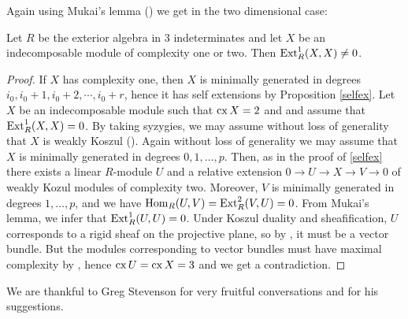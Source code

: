 \documentclass[10pt]{amsart}
\begin{document}
 \noindent  Again using Mukai's lemma (\cite[1.4]{Ru}) we get in the two dimensional case:
 
\begin{prop} Let $R$ be the exterior algebra in $3$ indeterminates
and let $X$ be an indecomposable  module of complexity one or two. Then $\operatorname{Ext}\nolimits^1_R(X,X)\ne 0$.
\end{prop}
\begin{proof}  If $X$ has complexity one, then $X$ is minimally generated in degrees $i_0, i_0+1, i_0+2, \cdots, i_0+r$,
hence it has self extensions by Proposition \ref{selfex}.
Let $X$ be an indecomposable module such that $\operatorname{cx}\nolimits X = 2$ and 
and assume that $\operatorname{Ext}\nolimits^1_R(X,X)=0$. By taking syzygies, we may assume without loss of generality that $X $ is weakly Koszul (\cite{MVZ1}). Again without loss of generality we may assume that $X$ is minimally generated in degrees $0,1,\ldots,p$. Then, as in the proof of \ref{selfex} there exists a linear $R$-module $U$ and a relative extension $0\to U\to X\to V\to 0$ of weakly Kozul modules of complexity  two. Moreover, $V$ is minimally generated in degrees $1,\ldots,p$, and we have $\operatorname{Hom}_R(U,V)=\operatorname{Ext}\nolimits_R^2(V,U)=0$. From Mukai's lemma, we infer that $\operatorname{Ext}\nolimits_R^1(U,U)=0$. Under Koszul duality and sheafification, $U$ corresponds to a rigid sheaf on the projective plane, so by \cite{D}, it must be a vector bundle. But the modules corresponding to vector bundles must have maximal complexity by \cite {AAH}, hence $\operatorname{cx}\nolimits U=\operatorname{cx}\nolimits X=3$ and we get a contradiction.
\end{proof} 
 
  We are thankful to Greg Stevenson for very fruitful conversations and for his suggestions.
 
\end{document}
